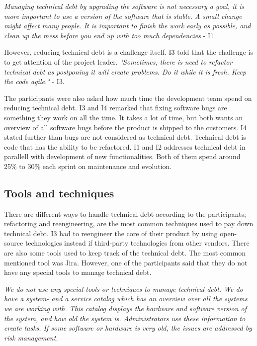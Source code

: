 \begin{displayquote}
\textit{Managing technical debt by upgrading the software is not necessary a goal, it is more important to use a version of the software that is stable.  A small change might affect many people. It is important to finish the work early as possible, and clean up the mess before you end up with too much dependencies} - I1
\end{displayquote}

However, reducing technical debt is a challenge itself. I3 told that the challenge is to get attention of the project leader. \textit{"Sometimes, there is need to refactor technical debt as postponing it will create problems. Do it while it is fresh. Keep the code agile."} - I3. 

The participants were also asked how much time the development team spend on reducing technical debt. I3 and I4 remarked that fixing software bugs are something they work on all the time. It takes a lot of time, but both wants an overview of all software bugs before the product is shipped to the customers. I4 stated further than bugs are not considered as technical debt. Technical debt is code that has the ability to be refactored. I1 and I2 addresses technical debt in parallell with development of new functionalities. Both of them spend around 25\% to 30\% each sprint on maintenance and evolution.



\subsection{Tools and techniques}
There are different ways to handle technical debt according to the participants; refactoring and reengineering, are the most common techniques used to pay down technical debt. I3 had to reengineer the core of their product by using open-source technologies instead if third-party technologies from other vendors. There are also some tools used to keep track of the technical debt. The most common mentioned tool was Jira. However, one of the participants said that they do not have any special tools to manage technical debt. 

\begin{displayquote}
	\textit{We do not use any special tools or techniques to manage technical debt. We do have a system- and a service catalog which has an overview over all the systems we are working with. This catalog displays the hardware and software version of the system, and how old the system is. Administrators use these information to create tasks. If some software or hardware is very old, the issues are addressed by risk management. }
\end{displayquote}

